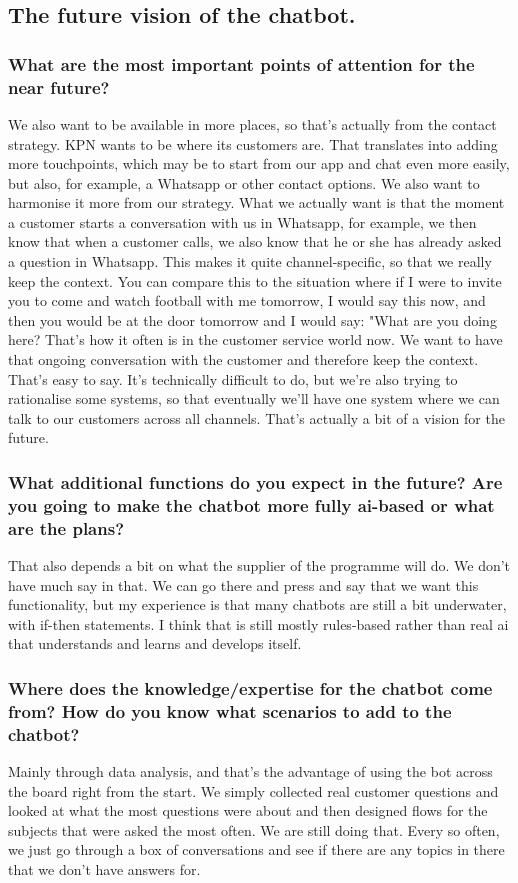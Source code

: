 \begin{appendices}
	\subsection{The future vision of the chatbot.}
	\subsubsection{What are the most important points of attention for the near future?}
	We also want to be available in more places, so that's actually from the contact strategy. KPN wants to be where its customers are. That translates into adding more touchpoints, which may be to start from our app and chat even more easily, but also, for example, a Whatsapp or other contact options. We also want to harmonise it more from our strategy. What we actually want is that the moment a customer starts a conversation with us in Whatsapp, for example, we then know that when a customer calls, we also know that he or she has already asked a question in Whatsapp. This makes it quite channel-specific, so that we really keep the context. You can compare this to the situation where if I were to invite you to come and watch football with me tomorrow, I would say this now, and then you would be at the door tomorrow and I would say: "What are you doing here? That's how it often is in the customer service world now. We want to have that ongoing conversation with the customer and therefore keep the context. That's easy to say. It's technically difficult to do, but we're also trying to rationalise some systems, so that eventually we'll have one system where we can talk to our customers across all channels. That's actually a bit of a vision for the future.
	
	\subsubsection{What additional functions do you expect in the future? Are you going to make the chatbot more fully \acrshort{ai}-based or what are the plans?}
	That also depends a bit on what the supplier of the programme will do. We don't have much say in that. We can go there and press and say that we want this functionality, but my experience is that many chatbots are still a bit underwater, with if-then statements. I think that is still mostly rules-based rather than real \acrshort{ai} that understands and learns and develops itself.
	
	\subsubsection{Where does the knowledge/expertise for the chatbot come from? How do you know what scenarios to add to the chatbot?}
	Mainly through data analysis, and that's the advantage of using the bot across the board right from the start. We simply collected real customer questions and looked at what the most questions were about and then designed flows for the subjects that were asked the most often. We are still doing that. Every so often, we just go through a box of conversations and see if there are any topics in there that we don't have answers for.
	
\end{appendices}

